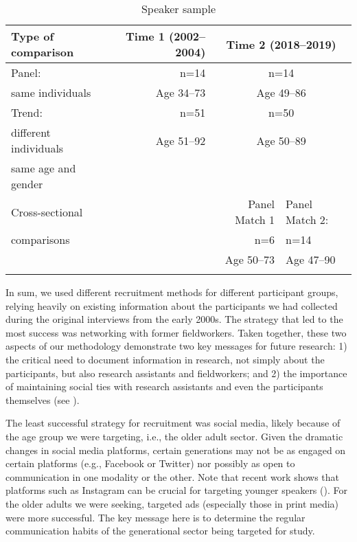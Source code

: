 \documentclass[output=paper]{langscibook}
\begin{document}
\begin{table}
\footnotesize
\begin{tabular}{lrrc}
\lsptoprule
Type of comparison & Time 1 (2002--2004) & \multicolumn{2}{c}{{ Time 2 (2018--2019)}}\\
\midrule
Panel: & n=14 & \multicolumn{2}{c}{n=14} \\
same individuals & Age 34--73 & \multicolumn{2}{c}{Age 49--86}\\
\midrule
Trend: & n=51& \multicolumn{2}{c}{n=50}\\
different individuals & Age 51--92 & \multicolumn{2}{c}{Age 50--89}\\
same age and gender &  & \multicolumn{2}{c}{}\\
\midrule
Cross-sectional&  & Panel Match 1 & \multicolumn{1}{l}{Panel Match 2: }\\
comparisons &  & n=6 & \multicolumn{1}{l}{n=14}\\
&  & Age 50--73 & \multicolumn{1}{l}{Age 47--90}\\
\lspbottomrule
\end{tabular}
\caption{Speaker sample}
\label{tab:pabst:4}
\end{table}

In sum, we used different recruitment methods for different participant groups, relying heavily on existing information about the participants we had collected during the original interviews from the early 2000s. The strategy that led to the most success was networking with former fieldworkers. Taken together, these two aspects of our methodology demonstrate two key messages for future research: 1) the critical need to document information in research, not simply about the participants, but also research assistants and fieldworkers; and 2) the importance of maintaining social ties with research assistants and even the participants themselves (see \citealt{WagnerTagliamonte2019}).

The least successful strategy for recruitment was social media, likely because of the age group we were targeting, i.e., the older adult sector. Given the dramatic changes in social media platforms, certain generations may not be as engaged on certain platforms (e.g., Facebook or Twitter) nor possibly as open to communication in one modality or the other. Note that recent work shows that platforms such as Instagram can be crucial for targeting younger speakers (\citealt{NesbittWatts2022}). For the older adults we were seeking, targeted ads (especially those in print media) were more successful. The key message here is to determine the regular communication habits of the generational sector being targeted for study.
\end{document}
